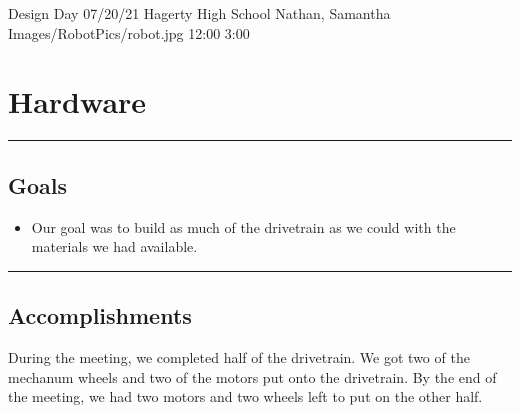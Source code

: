 \insertmeeting 
	{Design Day} 
	{07/20/21}
	{Hagerty High School}
	{Nathan, Samantha}
	{Images/RobotPics/robot.jpg}
	{12:00}
  {3:00}
	
\section*{Hardware}
\noindent\hfil\rule{\textwidth}{.4pt}\hfil
\subsection*{Goals}
\begin{itemize}
    \item Our goal was to build as much of the drivetrain as we could with the materials we had available.  

\end{itemize} 

\noindent\hfil\rule{\textwidth}{.4pt}\hfil

\subsection*{Accomplishments}
During the meeting, we completed half of the drivetrain. We got two of the mechanum wheels and two of the motors put onto the drivetrain. By the end of the meeting, we had two motors and two wheels left to put on the other half. 






